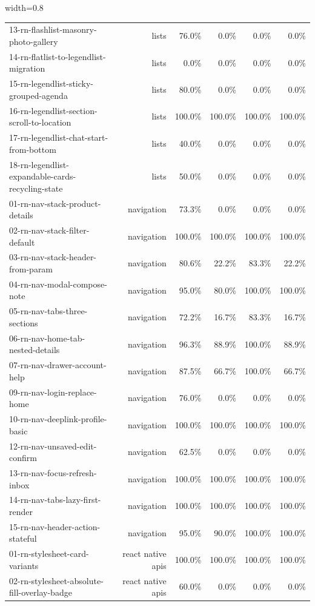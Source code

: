 \begin{table}[htbp]
\begin{adjustbox}{width=0.8\textwidth}
\begin{tabular}{lrrrrr}
13-rn-flashlist-masonry-photo-gallery & lists & 76.0\% & 0.0\% & 0.0\% & 0.0\% \\
14-rn-flatlist-to-legendlist-migration & lists & 0.0\% & 0.0\% & 0.0\% & 0.0\% \\
15-rn-legendlist-sticky-grouped-agenda & lists & 80.0\% & 0.0\% & 0.0\% & 0.0\% \\
16-rn-legendlist-section-scroll-to-location & lists & 100.0\% & 100.0\% & 100.0\% & 100.0\% \\
17-rn-legendlist-chat-start-from-bottom & lists & 40.0\% & 0.0\% & 0.0\% & 0.0\% \\
18-rn-legendlist-expandable-cards-recycling-state & lists & 50.0\% & 0.0\% & 0.0\% & 0.0\% \\
01-rn-nav-stack-product-details & navigation & 73.3\% & 0.0\% & 0.0\% & 0.0\% \\
02-rn-nav-stack-filter-default & navigation & 100.0\% & 100.0\% & 100.0\% & 100.0\% \\
03-rn-nav-stack-header-from-param & navigation & 80.6\% & 22.2\% & 83.3\% & 22.2\% \\
04-rn-nav-modal-compose-note & navigation & 95.0\% & 80.0\% & 100.0\% & 100.0\% \\
05-rn-nav-tabs-three-sections & navigation & 72.2\% & 16.7\% & 83.3\% & 16.7\% \\
06-rn-nav-home-tab-nested-details & navigation & 96.3\% & 88.9\% & 100.0\% & 88.9\% \\
07-rn-nav-drawer-account-help & navigation & 87.5\% & 66.7\% & 100.0\% & 66.7\% \\
09-rn-nav-login-replace-home & navigation & 76.0\% & 0.0\% & 0.0\% & 0.0\% \\
10-rn-nav-deeplink-profile-basic & navigation & 100.0\% & 100.0\% & 100.0\% & 100.0\% \\
12-rn-nav-unsaved-edit-confirm & navigation & 62.5\% & 0.0\% & 0.0\% & 0.0\% \\
13-rn-nav-focus-refresh-inbox & navigation & 100.0\% & 100.0\% & 100.0\% & 100.0\% \\
14-rn-nav-tabs-lazy-first-render & navigation & 100.0\% & 100.0\% & 100.0\% & 100.0\% \\
15-rn-nav-header-action-stateful & navigation & 95.0\% & 90.0\% & 100.0\% & 100.0\% \\
01-rn-stylesheet-card-variants & react native apis & 100.0\% & 100.0\% & 100.0\% & 100.0\% \\
02-rn-stylesheet-absolute-fill-overlay-badge & react native apis & 60.0\% & 0.0\% & 0.0\% & 0.0\% \\

\end{tabular}
\end{adjustbox}
\end{table}
